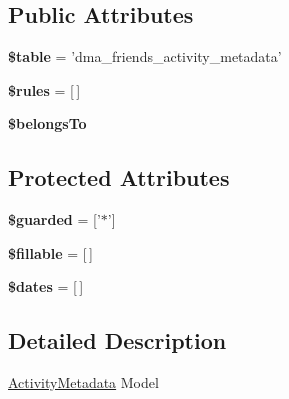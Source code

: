\subsection*{Public Attributes}
\begin{DoxyCompactItemize}
\item 
\hypertarget{classDMA_1_1Friends_1_1Models_1_1ActivityMetadata_a9c8aa7ea6d9f45141918ce6b7a570bc3}{{\bfseries \$table} = 'dma\+\_\+friends\+\_\+activity\+\_\+metadata'}\label{classDMA_1_1Friends_1_1Models_1_1ActivityMetadata_a9c8aa7ea6d9f45141918ce6b7a570bc3}

\item 
\hypertarget{classDMA_1_1Friends_1_1Models_1_1ActivityMetadata_a8038b90e92fe76cd7f7b86d32c8b01b8}{{\bfseries \$rules} = \mbox{[}$\,$\mbox{]}}\label{classDMA_1_1Friends_1_1Models_1_1ActivityMetadata_a8038b90e92fe76cd7f7b86d32c8b01b8}

\item 
{\bfseries \$belongs\+To}
\end{DoxyCompactItemize}
\subsection*{Protected Attributes}
\begin{DoxyCompactItemize}
\item 
\hypertarget{classDMA_1_1Friends_1_1Models_1_1ActivityMetadata_ae295fa39a4e26ba207f9c606a9348957}{{\bfseries \$guarded} = \mbox{[}'$\ast$'\mbox{]}}\label{classDMA_1_1Friends_1_1Models_1_1ActivityMetadata_ae295fa39a4e26ba207f9c606a9348957}

\item 
\hypertarget{classDMA_1_1Friends_1_1Models_1_1ActivityMetadata_a057b7754ecf2cacfa7be3fa003cae61e}{{\bfseries \$fillable} = \mbox{[}$\,$\mbox{]}}\label{classDMA_1_1Friends_1_1Models_1_1ActivityMetadata_a057b7754ecf2cacfa7be3fa003cae61e}

\item 
\hypertarget{classDMA_1_1Friends_1_1Models_1_1ActivityMetadata_a88007f604baf0815d66368f4dbdf88aa}{{\bfseries \$dates} = \mbox{[}$\,$\mbox{]}}\label{classDMA_1_1Friends_1_1Models_1_1ActivityMetadata_a88007f604baf0815d66368f4dbdf88aa}

\end{DoxyCompactItemize}


\subsection{Detailed Description}
\hyperlink{classDMA_1_1Friends_1_1Models_1_1ActivityMetadata}{Activity\+Metadata} Model 

